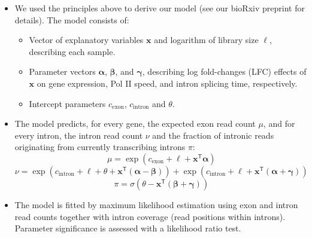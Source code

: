 \documentclass[20pt, a0paper, portrait, margin=0mm, innermargin=15mm,
blockverticalspace=15mm, colspace=15mm, subcolspace=8mm]{tikzposter}
\begin{document}
\begin{columns}
{\begin{itemize}
	\item We used the principles above to derive our model (see our bioRxiv preprint for details). The model consists of:
	\begin{itemize}
		\item Vector of explanatory variables $\mathbf{x}$ and logarithm of library size $\ell$, describing each sample.
		\item Parameter vectors $\boldsymbol{\alpha}$, $\boldsymbol{\beta}$, and $\boldsymbol{\gamma}$, describing log fold-changes (LFC) effects of $\mathbf{x}$ on gene expression, Pol II speed, and intron splicing time, respectively.
		\item Intercept parameters $c_{\text{exon}}$, $c_{\text{intron}}$ and $\theta$.
	\end{itemize}
	\item The model predicts, for every gene, the expected exon read count $\mu$, and for every intron, the intron read count $\nu$ and the fraction of intronic reads originating from currently transcribing introns $\pi$: 
	$$
	\mu =  \exp \left( c_{\text{exon}} + \ell +\mathbf{x}^\mathsf{T} \boldsymbol{\alpha} \right)
	$$ 
	$$
	\nu = \exp \left(c_{\text{intron}}+ \ell + \theta + \mathbf{x}^\mathsf{T} \left( \boldsymbol{\alpha} - \boldsymbol{\beta} \right) \right) + \exp \left( c_{\text{intron}} + \ell + \mathbf{x}^\mathsf{T} \left( \boldsymbol{\alpha} + \boldsymbol{\gamma} \right) \right)
	$$		
	$$
	\pi = \sigma \left( \theta -\mathbf{x}^\mathsf{T} \left( \boldsymbol{\beta} + \boldsymbol{\gamma} \right) \right)
	$$
	\item The model is fitted by maximum likelihood estimation using exon and intron read counts together with intron coverage (read positions within introns). Parameter significance is assessed with a likelihood ratio test.
	
\end{itemize}


	
		
		
		
}
\end{columns}
\end{document}
